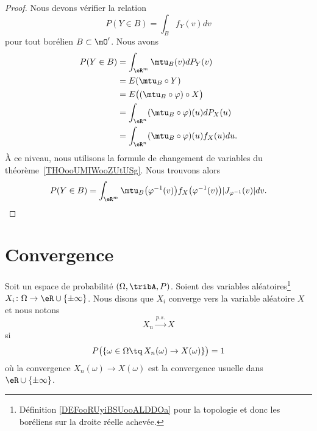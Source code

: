 \begin{proof}
	Nous devons vérifier la relation
	\begin{equation}
		P(Y\in B)=\int_Bf_Y(v)dv
	\end{equation}
	pour tout borélien \( B\subset \mO'\). Nous avons
	\begin{subequations}
		\begin{align}
			P(Y\in B) & =\int_{\eR^m}\mtu_{B}(v)dP_Y(v)                \\
			          & =E(\mtu_B\circ Y)                              \\
			          & =E\big( (\mtu_B\circ \varphi)\circ X\big)      \\
			          & =\int_{\eR^n}(\mtu_B\circ\varphi)(u)dP_X(u)    \\
			          & =\int_{\eR^n}(\mtu_B \circ\varphi)(u)f_X(u)du.
		\end{align}
	\end{subequations}
	À ce niveau, nous utilisons la formule de changement de variables du théorème~\ref{THOooUMIWooZUtUSg}. Nous trouvons alors
	\begin{equation}
		P(Y\in B)=\int_{\eR^m}\mtu_B\big( \varphi^{-1}(v) \big)f_X\big( \varphi^{-1}(v) \big)| J_{\varphi^{-1}}(v) |dv.
	\end{equation}
\end{proof}

\section{Convergence}

\begin{definition}      \label{DEFooZKLFooZkKuMC}
    Soit un espace de probabilité \( (\Omega,\tribA,P)\). Soient des variables aléatoires\footnote{Définition \ref{DEFooRUyiBSUooALDDOa} pour la topologie et donc les boréliens sur la droite réelle achevée.} \( X_i\colon \Omega\to \eR\cup\{ \pm\infty \}\).
    Nous disons que \( X_i\) converge  vers la variable aléatoire \( X\) et nous notons
    \begin{equation}
        X_n\stackrel{p.s.}{\longrightarrow}X
    \end{equation}
    si
    \begin{equation}
        P\big( \{ \omega\in\Omega\tq\,X_n(\omega)\to X(\omega) \} \big)=1
    \end{equation}
    où la convergence \( X_n(\omega)\to X(\omega)\) est la convergence usuelle dans \( \eR\cup\{ \pm\infty \}\).
\end{definition}

